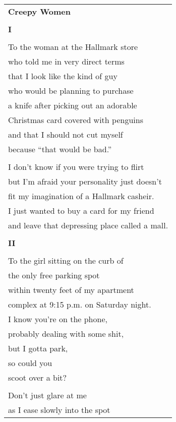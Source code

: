 \documentclass{article}
\begin{document}
\newcommand{\h}{\hspace{3ex}}
\newcommand{\hoar}{%
\begin{center}
\line(1,0){350}
\end{center}
}

\begin{center}
\begin{tabular}{l}
\textbf{Creepy Women} \\
\\
\textbf{I} \\
\\
To the woman at the Hallmark store \\
who told me in very direct terms \\
that I look like the kind of guy \\
who would be planning to purchase \\
a knife after picking out an adorable \\
Christmas card covered with penguins \\
and that I should not cut myself \\
because ``that would be bad.'' \\
\\
I don't know if you were trying to flirt \\
but I'm afraid your personality just doesn't \\
fit my imagination of a Hallmark casheir. \\
I just wanted to buy a card for my friend \\
and leave that depressing place called a mall. \\
\\
\textbf{II} \\
\\
To the girl sitting on the curb of \\
the only free parking spot \\
within twenty feet of my apartment \\
complex at 9:15 p.m. on Saturday night. \\
I know you're on the phone, \\
probably dealing with some shit, \\
but I gotta park, \\
so could you \\
scoot over a bit? \\
\\
Don't just glare at me \\
as I ease slowly into the spot \\

\end{tabular}
\end{center}
\end{document}
